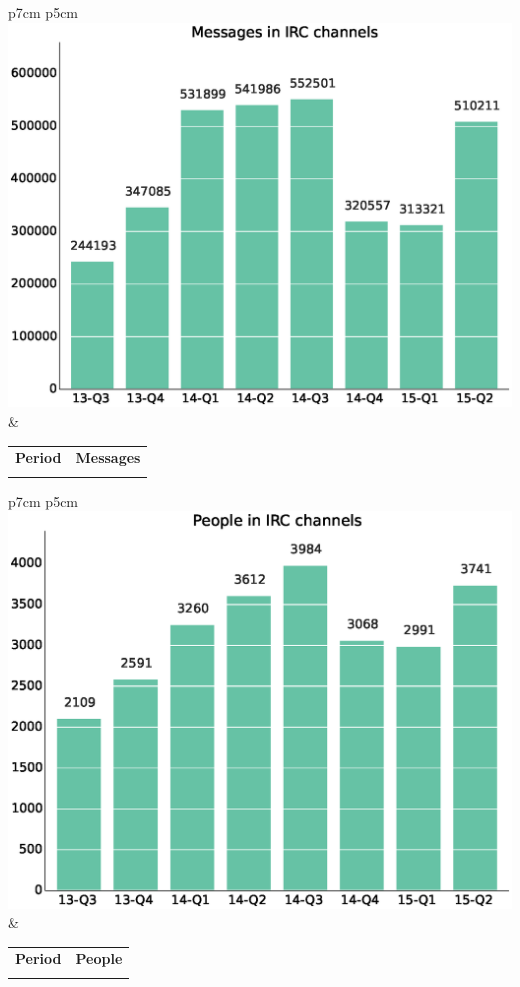 \documentclass[a4wide,11pt]{report}
\begin{document}
\begin{tabular}{p{7cm} p{5cm}}
    \vspace{0pt} 
    \includegraphics[scale=.35]{figs/irc_sent.eps}
    & 
    \vspace{0pt}
    \begin{tabular}{l|l}%
    \bfseries Period & \bfseries Messages %
    \csvreader[head to column names]{data/irc_sent.csv}{}%
    {\\ & \messages}
    \end{tabular}
\end{tabular}

\begin{tabular}{p{7cm} p{5cm}}
    \vspace{0pt} 
    \includegraphics[scale=.35]{figs/irc_senders.eps}
    & 
    \vspace{0pt}
    \begin{tabular}{l|l}%
    \bfseries Period & \bfseries People %
    \csvreader[head to column names]{data/irc_senders.csv}{}%
    {\\ & \senders}
    \end{tabular}
\end{tabular}
\end{document}
